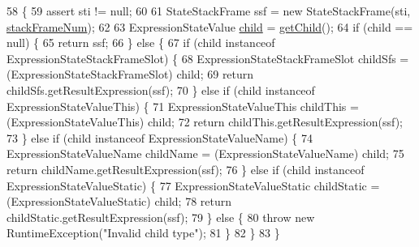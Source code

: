\begin{DoxyCode}
58                                                                                                    \{
59     assert sti != null;
60 
61     StateStackFrame ssf = \textcolor{keyword}{new} StateStackFrame(sti, \hyperlink{classgov_1_1nasa_1_1jpf_1_1inspector_1_1server_1_1expression_1_1expressions_1_1_expression_state_stack_frame_a8d86ca98d313121576886938dba7c40a}{stackFrameNum});
62 
63     ExpressionStateValue \hyperlink{classgov_1_1nasa_1_1jpf_1_1inspector_1_1server_1_1expression_1_1_expression_state_unary_operator_a66041b1f569a361549e28a00f7ca5f2f}{child} = \hyperlink{classgov_1_1nasa_1_1jpf_1_1inspector_1_1server_1_1expression_1_1_expression_state_unary_operator_a150bac338d6557f79ca185d3f6ad6e06}{getChild}();
64     \textcolor{keywordflow}{if} (child == null) \{
65       \textcolor{keywordflow}{return} ssf;
66     \} \textcolor{keywordflow}{else} \{
67       \textcolor{keywordflow}{if} (child instanceof ExpressionStateStackFrameSlot) \{
68         ExpressionStateStackFrameSlot childSfs = (ExpressionStateStackFrameSlot) child;
69         \textcolor{keywordflow}{return} childSfs.getResultExpression(ssf);
70       \} \textcolor{keywordflow}{else} \textcolor{keywordflow}{if} (child instanceof ExpressionStateValueThis) \{
71         ExpressionStateValueThis childThis = (ExpressionStateValueThis) child;
72         \textcolor{keywordflow}{return} childThis.getResultExpression(ssf);
73       \} \textcolor{keywordflow}{else} \textcolor{keywordflow}{if} (child instanceof ExpressionStateValueName) \{
74         ExpressionStateValueName childName = (ExpressionStateValueName) child;
75         \textcolor{keywordflow}{return} childName.getResultExpression(ssf);
76       \} \textcolor{keywordflow}{else} \textcolor{keywordflow}{if} (child instanceof ExpressionStateValueStatic) \{
77         ExpressionStateValueStatic childStatic = (ExpressionStateValueStatic) child;
78         \textcolor{keywordflow}{return} childStatic.getResultExpression(ssf);
79       \} \textcolor{keywordflow}{else} \{
80         \textcolor{keywordflow}{throw} \textcolor{keyword}{new} RuntimeException(\textcolor{stringliteral}{"Invalid child type"});
81       \}
82     \}
83   \}
\end{DoxyCode}
